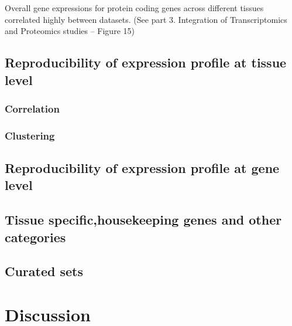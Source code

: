 Overall gene expressions for protein coding genes across different tissues
correlated highly between datasets. (See part 3. Integration of Transcriptomics
and Proteomics studies – Figure 15)



    \subsection{Reproducibility of expression profile at tissue level}\label{subsec:Trans_ReproExpresTissue}

        \subsubsection{Correlation}\label{subsubsec:Trans_Tissue_Corr}
        \subsubsection{Clustering}\label{subsubsec:Trans_Tissue_cluster}

    \subsection{Reproducibility of expression profile at gene level}\label{subsec:Trans_ReproExpresGene}

    \subsection{Tissue specific,housekeeping genes and other categories}\label{subsec:Trans_TissueSpeAndHK}

    \subsection{Curated sets}\label{subsec:Trans_curatedSets}

\section{Discussion}\label{sec:Trans_discussion}



\begin{comment}
  \begin{figure}%
      \includegraphics%
      {transcriptomics/}\centering
      \caption[]
      {\label{fig:}\textbf{}}
  \end{figure}
\end{comment}
